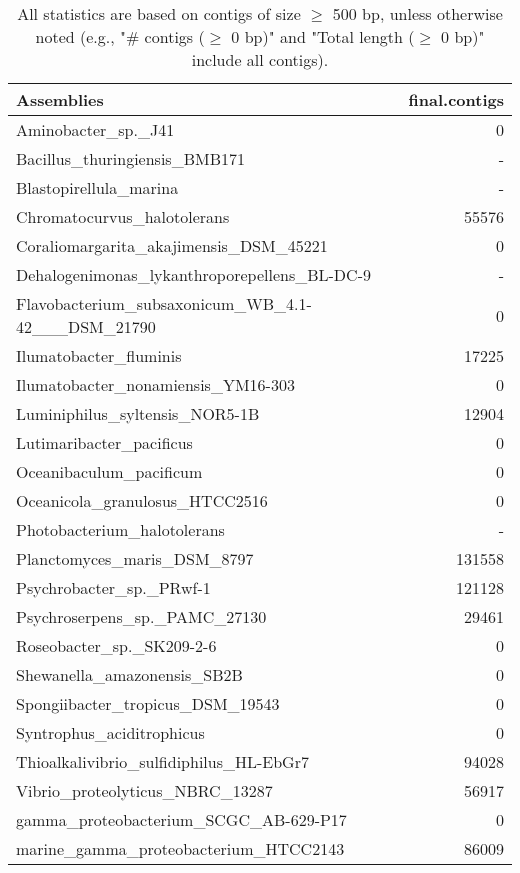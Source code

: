 \documentclass[12pt,a4paper]{article}
\begin{document}
\begin{table}[ht]
\begin{center}
\caption{All statistics are based on contigs of size $\geq$ 500 bp, unless otherwise noted (e.g., "\# contigs ($\geq$ 0 bp)" and "Total length ($\geq$ 0 bp)" include all contigs).}
\begin{tabular}{|l*{1}{|r}|}
\hline
Assemblies & final.contigs \\ \hline
Aminobacter\_sp.\_J41 & 0 \\ \hline
Bacillus\_thuringiensis\_BMB171 & - \\ \hline
Blastopirellula\_marina & - \\ \hline
Chromatocurvus\_halotolerans & 55576 \\ \hline
Coraliomargarita\_akajimensis\_DSM\_45221 & 0 \\ \hline
Dehalogenimonas\_lykanthroporepellens\_BL-DC-9 & - \\ \hline
Flavobacterium\_subsaxonicum\_WB\_4.1-42\_\_\_DSM\_21790 & 0 \\ \hline
Ilumatobacter\_fluminis & 17225 \\ \hline
Ilumatobacter\_nonamiensis\_YM16-303 & 0 \\ \hline
Luminiphilus\_syltensis\_NOR5-1B & 12904 \\ \hline
Lutimaribacter\_pacificus & 0 \\ \hline
Oceanibaculum\_pacificum & 0 \\ \hline
Oceanicola\_granulosus\_HTCC2516 & 0 \\ \hline
Photobacterium\_halotolerans & - \\ \hline
Planctomyces\_maris\_DSM\_8797 & 131558 \\ \hline
Psychrobacter\_sp.\_PRwf-1 & 121128 \\ \hline
Psychroserpens\_sp.\_PAMC\_27130 & 29461 \\ \hline
Roseobacter\_sp.\_SK209-2-6 & 0 \\ \hline
Shewanella\_amazonensis\_SB2B & 0 \\ \hline
Spongiibacter\_tropicus\_DSM\_19543 & 0 \\ \hline
Syntrophus\_aciditrophicus & 0 \\ \hline
Thioalkalivibrio\_sulfidiphilus\_HL-EbGr7 & 94028 \\ \hline
Vibrio\_proteolyticus\_NBRC\_13287 & 56917 \\ \hline
gamma\_proteobacterium\_SCGC\_AB-629-P17 & 0 \\ \hline
marine\_gamma\_proteobacterium\_HTCC2143 & 86009 \\ \hline
\end{tabular}
\end{center}
\end{table}
\end{document}
